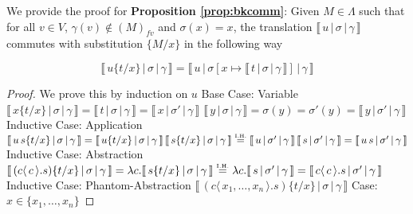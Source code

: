 \documentclass[a4paper,UKenglish,cleveref, autoref]{lipics-v2019}
\newcommand{\fv}[1]{(#1)_{fv}}
\newcommand{\set}[1]{ \{ #1 \} }
\newcommand{\abs}[2]{\lambda #1 . #2}
\newcommand{\app}[2]{#1 \, #2}
\newcommand{\fake}[3]{#1 \langle \, #2 \, \rangle . #3}
\newcommand{\sub}[3]{#1 \{ #2 / #3 \}}
\newcommand{\readbackwmap}[3]{\llbracket \, #1 \, \vert \, #2 \, \vert \, #3  \, \rrbracket }
\newcommand{\IH}{\stackrel{\hbox{\tiny I.H.}}{\hbox{=}}}
\begin{document}
\noindent We provide the proof for {\bf Proposition \ref{prop:bkcomm}}: Given $M \in \Lambda$ such that for all $v \in V$, $\gamma(v) \not\in \fv{M}$  and $\sigma(x) = x$, the translation $\readbackwmap{u}{\sigma}{\gamma}$ commutes with substitution $\sub{}{M}{x}$ in the following way

$$\readbackwmap{u \sub{}{t}{x}}{\sigma}{\gamma} = \readbackwmap{u}{\sigma[x \mapsto \readbackwmap{t}{\sigma}{\gamma}]}{\gamma}$$

%

\begin{proof}
We prove this by induction on $u$
\newline
\newline
Base Case: Variable
\newline
$\readbackwmap{x \sub{}{t}{x}}{\sigma}{\gamma} = \readbackwmap{t}{\sigma}{\gamma} = \readbackwmap{x}{\sigma'}{\gamma}$
\newline
\newline
$\readbackwmap{y}{\sigma}{\gamma} = \sigma(y) = \sigma'(y) = \readbackwmap{y}{\sigma'}{\gamma}$
\newline
\newline
Inductive Case: Application
\newline
$\readbackwmap{\app{u}{s} \sub{}{t}{x}}{\sigma}{\gamma} = \app{\readbackwmap{u \sub{}{t}{x}}{\sigma}{\gamma}}{\readbackwmap{s \sub{}{t}{x}}{\sigma}{\gamma}} \IH \app{\readbackwmap{u}{\sigma'}{\gamma}}{\readbackwmap{s}{\sigma'}{\gamma}} = \readbackwmap{\app{u}{s}}{\sigma'}{\gamma}$
\newline
\newline
Inductive Case: Abstraction
\newline
$\readbackwmap{(\fake{c}{c}{s}) \sub{}{t}{x}}{\sigma}{\gamma} = \abs{c}{\readbackwmap{s \sub{}{t}{x}}{\sigma}{\gamma}} \IH \abs{c}{\readbackwmap{s}{\sigma'}{\gamma}} = \readbackwmap{\fake{c}{c}{s}}{\sigma'}{\gamma}$
\newline
\newline
Inductive Case: Phantom-Abstraction
\newline
$\readbackwmap{(\fake{c}{x_{1}, \dots, x_{n}}{s}) \sub{}{t}{x}}{\sigma}{\gamma}$
\newline
\indent Case: $x \in \set{x_{1}, \dots, x_{n}}$

\end{proof}
\end{document}
